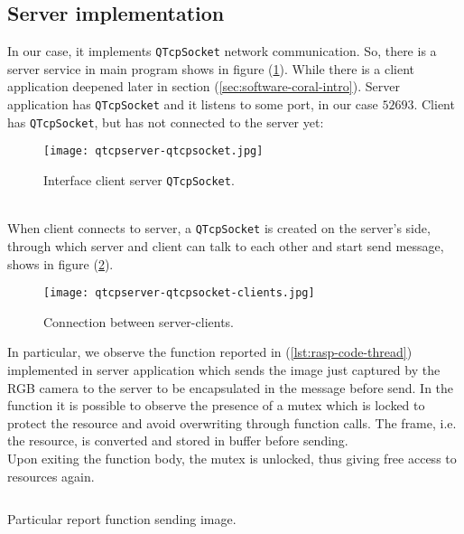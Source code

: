 \subsection{Server implementation}
\label{ssec:soft-rasp-server}
In our case, it implements \texttt{QTcpSocket} network communication.  So, there
is a server service in main program shows in figure
(\ref{fig:software-socket-server}). While there is a client application deepened
later in section (\ref{sec:software-coral-intro}). Server application has
\texttt{QTcpSocket} and it listens to some port, in our case $52693$.
 Client has \texttt{QTcpSocket}, but has not connected to the server yet:\linebreak
%
%
\begin{figure}[!ht]
	\centering
	\texttt{[image: qtcpserver-qtcpsocket.jpg]}
	\caption{Interface client server \texttt{QTcpSocket}.}
	\label{fig:software-socket-server}
\end{figure}
%
\\When client connects to server, a \texttt{QTcpSocket} is created on the server’s
side, through which server and client can talk to each other and start send
message, shows in figure (\ref{fig:software-socket-server-client}).
%
%
\begin{figure}[htb]
	\centering
	\texttt{[image: qtcpserver-qtcpsocket-clients.jpg]}
	\caption{Connection between server-clients.}
	\label{fig:software-socket-server-client}
\end{figure}
%
In particular, we observe the function reported in (\ref{lst:rasp-code-thread})
implemented in server application which sends the image just captured by the RGB
camera to the server to be  encapsulated in the message before send. 
In the function it is possible to observe the presence of a mutex which is 
locked to protect the resource and avoid overwriting through function calls.
The frame, i.e. the resource, is converted and stored in buffer before
sending.\\ 
Upon exiting the function body, the mutex is unlocked, thus giving free
access to resources again.
\begin{listing}[ht]
\inputminted[frame=lines,framesep=2mm, linenos=true, autogobble, breaklines=true, fontsize=\scriptsize, firstline=84, lastline=95]{c++}{software/code/mainwindow.cpp} 
\caption{Particular report function sending image.} 
\label{lst:rasp-code-thread} 
\end{listing}
